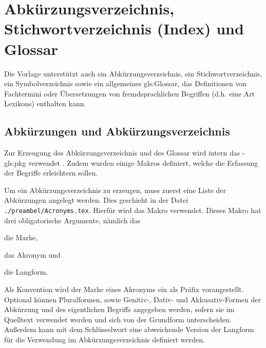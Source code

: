 \section{Abkürzungsverzeichnis, Stichwortverzeichnis (Index) und Glossar}%
\label{sec:Glossare}
%
Die Vorlage unterstützt auch ein Abkürzungsverzeichnis, ein Stichwortverzeichnis,
ein Symbolverzeichnis sowie ein allgemeines \gls{gls:Glossar},
das Definitionen von Fachtermini oder
Übersetzungen von fremdsprachlichen Begriffen
(d.h. eine Art Lexikons) enthalten kann.


\subsection{Abkürzungen und Abkürzungsverzeichnis}%
\label{sec:Akronyme}
Zur Erzeugung des Abkürzungsverzeichnis und des Glossar wird intern das
-\gls{gls:pkg} verwendet \cite{talbot2014}.
Zudem wurden einige Makros definiert, welche die Erfassung der Begriffe erleichtern sollen.

Um ein Abkürzungsverzeichnis zu erzeugen, muss zuerst eine Liste der Abkürzungen angelegt werden.
Dies geschieht in der Datei \texttt{./preambel/Acronyms.tex}.
Hierfür wird das Makro  verwendet.
Dieses Makro hat drei obligatorische Argumente, nämlich das
\begin{itemize*}
\item die Marke,
\item das Akronym und
\item die Langform.
\end{itemize*}
Als Konvention wird der Marke eines Akronyms ein  als Präfix vorangestellt.
Optional können Pluralformen, sowie Genitiv-, Dativ- und Akkusativ-Formen 
der Abkürzung und des eigentlichen Begriffs angegeben werden,
sofern sie im Quelltext verwendet werden und sich von der Grundform unterscheiden.
Außerdem kann mit dem Schlüsselwort 
eine abweichende Version der Langform für die Verwendung im Abkürzungsverzeichnis definiert werden.

